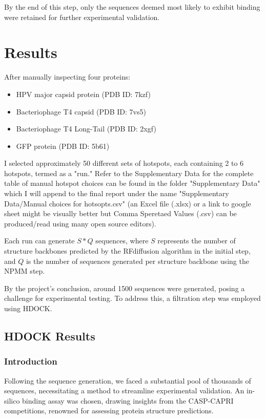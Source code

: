 \documentclass[11pt,a4paper]{article}
\begin{document}
By the end of this step, only the sequences deemed most likely to exhibit binding were retained for further experimental validation.


\section{Results}

After manually inspecting four proteins:

\begin{itemize}
    \item HPV major capsid protein (PDB ID: 7kzf)
    \item Bacteriophage T4 capsid (PDB ID: 7vs5)
    \item Bacteriophage T4 Long-Tail (PDB ID: 2xgf)
    \item GFP protein (PDB ID: 5b61)
\end{itemize}

I selected approximately 50 different sets of hotspots, each containing 2 to 6 hotspots, termed as a "run." Refer to the Supplementary Data for the complete table of manual hotspot choices can be found in the folder "Supplementary Data" which I will append to the final report under the name "Supplementary Data/Manual choices for hotsopts.csv" (an Excel file (.xlsx) or a link to google sheet might be visually better but Comma Speretaed Values (.csv) can be produced/read using many open source editors). 

Each run can generate $S*Q$ sequences, where $S$ represents the number of structure backbones predicted by the RFdiffusion algorithm in the initial step, and $Q$ is the number of sequences generated per structure backbone using the NPMM step.

By the project's conclusion, around 1500 sequences were generated, posing a challenge for experimental testing. To address this, a filtration step was employed using HDOCK.

\subsection{HDOCK Results}

\subsubsection{Introduction}

Following the sequence generation, we faced a substantial pool of thousands of sequences, necessitating a method to streamline experimental validation. An in-silico binding assay was chosen, drawing insights from the CASP-CAPRI competitions, renowned for assessing protein structure predictions.
\end{document}
